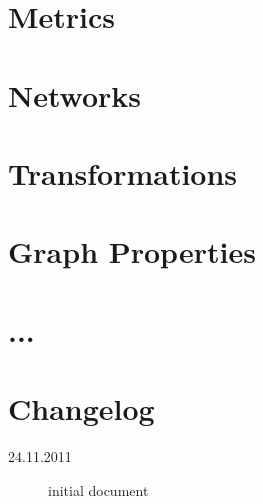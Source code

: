 \documentclass[11pt]{amsart}
\begin{document}
\section{Metrics}

\section{Networks}

\section{Transformations}

\section{Graph Properties}

\section{...}

\section*{Changelog}

\begin{description}
	\item[24.11.2011] initial document
\end{description}
\end{document}
